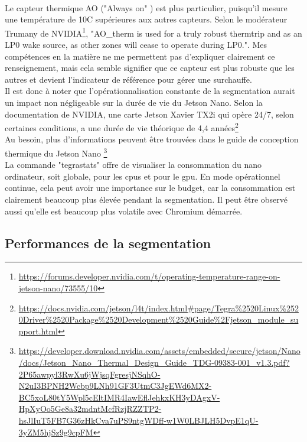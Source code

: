 \vspace{\baselineskip}
\\
\noindent Le capteur thermique AO ("Always on" ) est plus particulier, puisqu'il mesure une température de 10C supérieures aux autres capteurs. Selon le modérateur Trumany de NVIDIA\footnote{\url{https://forums.developer.nvidia.com/t/operating-temperature-range-on-jetson-nano/73555/10}}, "AO\_therm is used for a truly robust thermtrip and as an LP0 wake source, as other zones will cease to operate during LP0.". Mes compétences en la matière ne me permettent pas d'expliquer clairement ce renseignement, mais cela semble signifier que ce capteur est plus robuste que les autres et devient l'indicateur de référence pour gérer une surchauffe. 
\vspace{\baselineskip}
\\
\noindent Il est donc à noter que l'opérationnalisation constante de la segmentation aurait un impact non négligeable sur la durée de vie du Jetson Nano. Selon la documentation de NVIDIA, une carte Jetson Xavier TX2i qui opère 24/7, selon certaines conditions, a une durée de vie théorique de 4,4 années\footnote{\url{https://docs.nvidia.com/jetson/l4t/index.html#page/Tegra\%2520Linux\%2520Driver\%2520Package\%2520Development\%2520Guide\%2Fjetson_module_support.html}}
\vspace{\baselineskip}
\\
\noindent Au besoin, plus d'informations peuvent être trouvées dans le guide de conception thermique du Jetson Nano \footnote{\url{https://developer.download.nvidia.com/assets/embedded/secure/jetson/Nano/docs/Jetson_Nano_Thermal_Design_Guide_TDG-09383-001_v1.3.pdf?2P65awpyl3RwXu6jWjsqFgresjNSqhO-N2uI3BPNH2Wcbp9LNh91GF3UtmC3JgEWd6MX2-BC5xoL80tY5Wpl5cEltIMR4IawEflJehkxKH3yDAgxV-HpXyOo5Ge8a32mdntMcfRzjRZZTP2-hsJlIuT5FB7G36zHkCva7uPS9ntgWDff-w1W0LBJLH5DvpE1qU-3yZM5hjSz9g9cpFM}}
\vspace{\baselineskip}
\\
\noindent La commande "tegrastats" offre de visualiser la consommation du nano ordinateur, soit globale, pour les \acrshort{cpu}s et pour le \acrshort{gpu}. En mode opérationnel continue, cela peut avoir une importance sur le budget, car la consommation est clairement beaucoup plus élevée pendant la segmentation. Il peut être observé aussi qu'elle est beaucoup plus volatile avec Chromium démarrée. 
\subsection{Performances de la segmentation}
